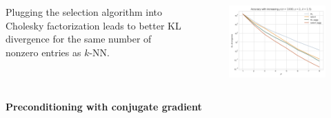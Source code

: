\documentclass{beamer}                             %
\newcommand{\blocktitle}[1]{{\Large \textbf{#1}}}
\begin{document}
\begin{frame}[t]
\begin{columns}[T]
\begin{column}{0.30\textwidth}
\begin{tcolorbox}
    \begin{columns}
      \begin{column}{0.5\textwidth}
        Plugging the selection algorithm into Cholesky
        factorization leads to better KL divergence for
        the same number of nonzero entries as \( k \)-NN.
      \end{column}
      \begin{column}{0.5\textwidth}
        \begin{figure}[h!]
          \centering
          \includegraphics[width=\textwidth]{data/rho_kl-div.png}
        \end{figure}
      \end{column}
    \end{columns}
  \end{tcolorbox}

  \begin{tcolorbox}
    \blocktitle{Preconditioning with conjugate gradient}


\end{tcolorbox}
\end{column}
\end{columns}
\end{frame}
\end{document}
